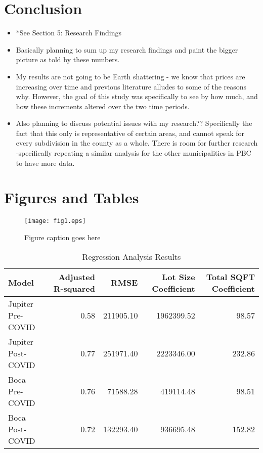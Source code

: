 \documentclass[12pt,english]{article}
\begin{document}
\section{Conclusion}\label{sec:conclusion}
\begin{itemize}
    \item *See Section 5: Research Findings 
    \item Basically planning to sum up my research findings and paint the bigger picture as told by these numbers. 
    \item My results are not going to be Earth shattering - we know that prices are increasing over time and previous literature alludes to some of the reasons why. However, the goal of this study was specifically to see by how much, and how these increments altered over the two time periods. 
    \item Also planning to discuss potential issues with my research?? Specifically the fact that this only is representative of certain areas, and cannot speak for every subdivision in the county as a whole. There is room for further research -specifically repeating a similar analysis for the other municipalities in PBC to have more data. 
\end{itemize}
\vfill
\pagebreak{}
\begin{spacing}{1.0}


\end{spacing}

\vfill
\pagebreak{}
\clearpage

\section*{Figures and Tables}\label{sec:figTables}
\begin{figure}[ht]
\centering
\bigskip{}
\texttt{[image: fig1.eps]}
\caption{Figure caption goes here}
\label{fig:fig1}
\end{figure}


\begin{table}[h]
\centering
\caption{Regression Analysis Results}
\begin{tabular}{lrrrr}
\toprule
Model & Adjusted R-squared & RMSE & Lot Size Coefficient & Total SQFT Coefficient \\
\midrule
Jupiter Pre-COVID & 0.58 & 211905.10 & 1962399.52 & 98.57 \\
Jupiter Post-COVID & 0.77 & 251971.40 & 2223346.00 & 232.86 \\
Boca Pre-COVID & 0.76 & 71588.28 & 419114.48 & 98.51 \\
Boca Post-COVID & 0.72 & 132293.40 & 936695.48 & 152.82 \\
\bottomrule
\end{tabular}
\end{table}
\end{document}

